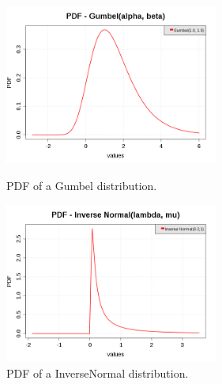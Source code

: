\begin{figure}[H]
  \begin{minipage}{10cm}
    \begin{center}
      \includegraphics[width=7cm]{pdf_Gumbel.png}
      \caption{PDF of a Gumbel distribution.}
      \label{PDFGumbel}
    \end{center}
  \end{minipage}
  \hfill
  \begin{minipage}{10cm}
    \begin{center}
      \includegraphics[width=7cm]{pdf_InverseNormal_1.png}
      \caption{PDF of a InverseNormal distribution.}
      \label{PDFInverseNormal1}
    \end{center}
  \end{minipage}
\end{figure}




